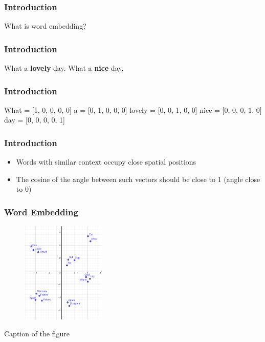 \begin{frame}
	\frametitle{Introduction}
	
	\begin{center}
		\Huge {What is word embedding?}
	\end{center}
\end{frame}



\begin{frame}
	\frametitle{Introduction}
	
	
		\huge {What a \textbf{lovely} day.}
		 \newline
		\huge{What a \textbf{nice} day.}

\end{frame}

\begin{frame}
	\frametitle{Introduction}
	
	
		\huge {What = [1, 0, 0, 0, 0]}
		 \newline
		\huge{a = [0, 1, 0, 0, 0]}
		\newline
		\huge{lovely = [0, 0, 1, 0, 0]}
		\newline
		\huge{nice = [0, 0, 0, 1, 0]}
		\newline
		\huge{day = [0, 0, 0, 0, 1]}

\end{frame}

\begin{frame}
\frametitle{Introduction}

\begin{itemize}
	\item Words with similar context occupy close spatial positions
	\item The cosine of the angle between such vectors should be close to 1 (angle close to 0)
\end{itemize}

\end{frame}

\begin{frame}
	\frametitle{Word Embedding}

	\begin{figure}
		\includegraphics[width=4cm]{./figures/Groups}

	\end{figure}
		\begin{center}
		{Caption of the figure}
		\end{center}
	\vspace{-0.5cm}



\end{frame}

